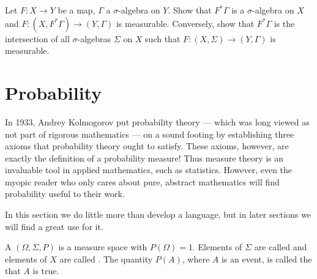
\begin{exercise}\label{pullback makes sense}
Let $F: X \to Y$ be a map, $\Gamma$ a $\sigma$-algebra on $Y$.
Show that $F^{*}\Gamma$ is a $\sigma$-algebra on $X$ and $F: (X, F^{*}\Gamma) \to (Y, \Gamma)$ is measurable.
Conversely, show that $F^{*}\Gamma$ is the intersection of all $\sigma$-algebras $\Sigma$ on $X$ such that $F: (X, \Sigma) \to (Y, \Gamma)$ is measurable.
\end{exercise}

\section{Probability}
In 1933, Andrey Kolmogorov put probability theory --- which was long viewed as not part of rigorous mathematics --- on a sound footing by establishing three axioms that probability theory ought to satisfy.
These axioms, however, are exactly the definition of a probability measure!
Thus measure theory is an invaluable tool in applied mathematics, such as statistics.
However, even the myopic reader who only cares about pure, abstract mathematics will find probability useful to their work.

In this section we do little more than develop a language, but in later sections we will find a great use for it.

\begin{definition}
A  $(\Omega, \Sigma, P)$ is a measure space with $P(\Omega) = 1$.
Elements of $\Sigma$ are called  and elements of $X$ are called .
The quantity $P(A)$, where $A$ is an event, is called the  that $A$ is true.
\end{definition}

